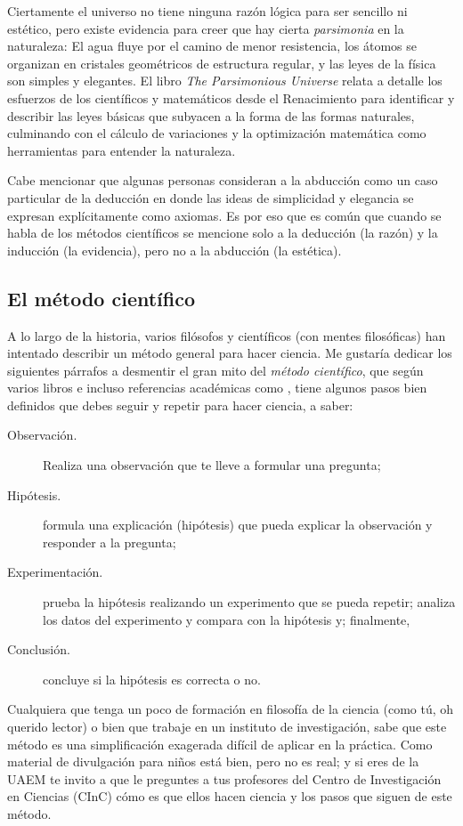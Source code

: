 Ciertamente el universo no tiene ninguna razón lógica para ser sencillo ni
estético, pero existe evidencia para creer que hay cierta \emph{parsimonia} en
la naturaleza:
El agua fluye por el camino de menor resistencia, los átomos se organizan en
cristales geométricos de estructura regular, y las leyes de la física son
simples y elegantes.
El libro \emph{The Parsimonious Universe}\cite{Hildebrandt2012} relata a detalle
los esfuerzos de los científicos y matemáticos desde el Renacimiento para
identificar y describir las leyes básicas que subyacen a la forma de las formas
naturales, culminando con el cálculo de variaciones y la optimización matemática
como herramientas para entender la naturaleza.

Cabe mencionar que algunas personas consideran a la abducción como un caso
particular de la deducción en donde las ideas de simplicidad y elegancia se
expresan explícitamente como axiomas.
Es por eso que es común que cuando se habla de los métodos científicos se
mencione solo a la deducción (la razón) y la inducción (la evidencia), pero no
a la abducción (la estética).

\subsection*{El método científico}
\label{sub:elmetodocientifico}
A lo largo de la historia, varios filósofos y científicos (con mentes
filosóficas) han intentado describir un método general para hacer ciencia.
Me gustaría dedicar los siguientes párrafos a desmentir el gran mito del
\emph{método científico}, que según varios libros e incluso referencias
académicas como \cite{Crawford1990}, tiene algunos pasos bien definidos que
debes seguir y repetir para hacer ciencia, a saber:
\begin{description}
    \item[Observación.] Realiza una observación que te lleve a formular
          una pregunta;
    \item[Hipótesis.] formula una explicación (hipótesis) que pueda explicar la
          observación y responder a la pregunta;
    \item[Experimentación.] prueba la hipótesis realizando un
          experimento que se pueda repetir; analiza los datos del experimento y
          compara con la hipótesis y; finalmente,
    \item[Conclusión.] concluye si la hipótesis es correcta o no.
\end{description}
Cualquiera que tenga un poco de formación en filosofía de la ciencia (como tú,
oh querido lector) o bien que trabaje en un instituto de investigación, sabe que
este método es una simplificación exagerada difícil de aplicar en la práctica.
Como material de divulgación para niños está bien, pero no es real; y si eres de
la UAEM te invito a que le preguntes a tus profesores del Centro de
Investigación en Ciencias (CInC) cómo es que ellos hacen ciencia y los pasos que
siguen de este método.

